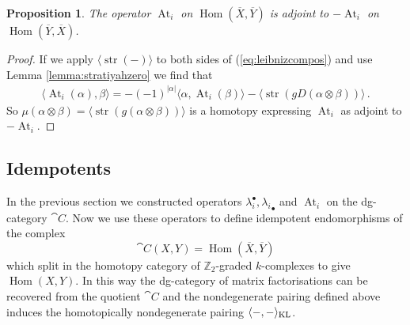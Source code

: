 \documentclass{compositio}
\newtheorem{proposition}[theorem]{Proposition}
\theoremstyle{definition}
\numberwithin{equation}{section}
\def\Hom{\operatorname{Hom}}
\DeclareMathOperator{\str}{str}
\DeclareMathOperator{\At}{At}
\begin{document}
\begin{proposition} The operator $\At_i$ on $\Hom(\overline{X}, \overline{Y})$ is adjoint to $-\At_i$ on $\Hom(\overline{Y}, \overline{X})$.
\end{proposition}
\begin{proof}
If we apply $\langle \str( - ) \rangle$ to both sides of (\ref{eq:leibnizcompos}) and use Lemma \ref{lemma:stratiyahzero} we find that
\begin{align*}
\langle \At_i(\alpha), \beta \rangle = -(-1)^{|\alpha|} \langle \alpha,  \At_i(\beta) \rangle - \langle \str( gD(\alpha \otimes \beta) ) \rangle\,.
\end{align*}
So $\mu( \alpha \otimes \beta ) = \langle \str( g( \alpha \otimes \beta ) ) \rangle$ is a homotopy expressing $\At_i$ as adjoint to $-\At_i$.
\end{proof}

\subsection{Idempotents}

In the previous section we constructed operators $\lambda_i^\bullet, {\lambda_i}_\bullet$ and $\At_i$ on the dg-category $\cat{C}$. Now we use these operators to define idempotent endomorphisms of the complex
\[
\cat{C}(X,Y) = \Hom(\overline{X}, \overline{Y})
\]
which split in the homotopy category of $\mathbb{Z}_2$-graded $k$-complexes to give $\Hom(X,Y)$. In this way the dg-category of matrix factorisations can be recovered from the quotient $\cat{C}$ and the nondegenerate pairing defined above induces the homotopically nondegenerate pairing $\langle -, - \rangle_{\textup{KL}}$.
\end{document}
